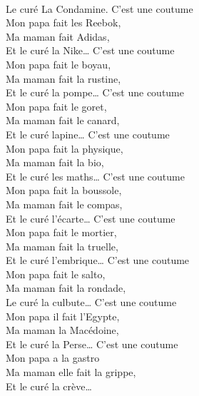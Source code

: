 \\Le curé La Condamine. \bissimple
{}
{C’est une coutume}
\\Mon papa fait les Reebok, \bissimple
\\Ma maman fait Adidas, \bissimple
\\Et le curé la Nike… \bissimple
{}
{C’est une coutume}
\\Mon papa fait le boyau, \bissimple
\\Ma maman fait la rustine, \bissimple
\\Et le curé la pompe… \bissimple
{}
{C’est une coutume}
\\Mon papa fait le goret, \bissimple
\\Ma maman fait le canard, \bissimple
\\Et le curé lapine… \bissimple
{}
{C’est une coutume}
\\Mon papa fait la physique, \bissimple
\\Ma maman fait la bio, \bissimple
\\Et le curé les maths… \bissimple
\breakpage
{}
{C’est une coutume}
\\Mon papa fait la boussole, \bissimple
\\Ma maman fait le compas, \bissimple
\\Et le curé l’écarte… \bissimple
{}
{C’est une coutume}
\\Mon papa fait le mortier, \bissimple
\\Ma maman fait la truelle, \bissimple
\\Et le curé l’embrique… \bissimple
{}
{C’est une coutume}
\\Mon papa fait le salto, \bissimple
\\Ma maman fait la rondade, \bissimple
\\Le curé la culbute… \bissimple
{}
{C’est une coutume}
\\Mon papa il fait l’Egypte, \bissimple
\\Ma maman la Macédoine, \bissimple
\\Et le curé la Perse… \bissimple
{}
{C’est une coutume}
\\Mon papa a la gastro \bissimple
\\Ma maman elle fait la grippe, \bissimple
\\Et le curé la crève… \bissimple
